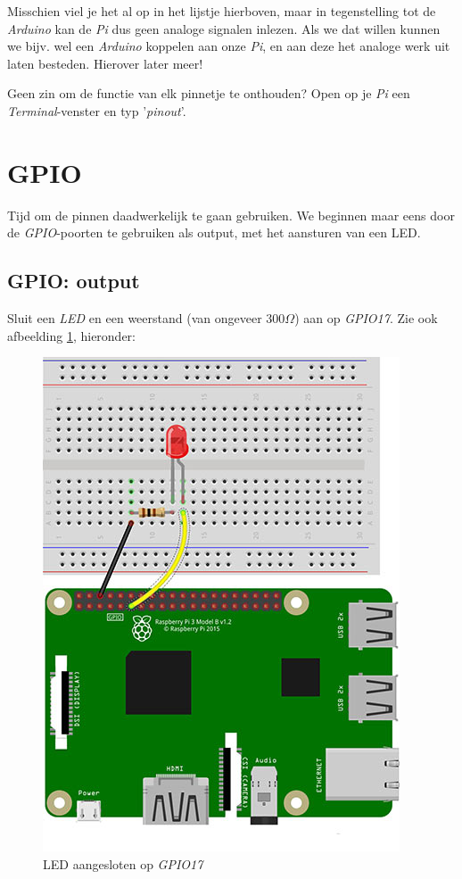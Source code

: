 \begin{remark}
Misschien viel je het al op in het lijstje hierboven, maar in tegenstelling tot de \textit{Arduino} kan de \textit{Pi} dus geen analoge signalen inlezen. Als we dat willen kunnen we bijv. wel een \textit{Arduino} koppelen aan onze \textit{Pi}, en aan deze het analoge werk uit laten besteden. Hierover later meer!    
\end{remark}

\begin{exercise}
Geen zin om de functie van elk pinnetje te onthouden? Open op je \textit{Pi} een \textit{Terminal}-venster en typ '\textit{pinout}'.
\end{exercise}

\newpage

\section{GPIO}
Tijd om de pinnen daadwerkelijk te gaan gebruiken. We beginnen maar eens door de \textit{GPIO}\--poorten te gebruiken als output, met het aansturen van een LED.
\subsection{GPIO: output}
Sluit een \textit{LED} en een weerstand (van ongeveer $300 \Omega$) aan op \textit{GPIO17}. Zie ook afbeelding \ref{fig:pi_led}, hieronder:
\begin{figure}[h!]
\centering\includegraphics[scale=0.45]{Pictures/chapter05/pi_led_01.jpg}
\caption{LED aangesloten op \textit{GPIO17}}
\label{fig:pi_led} %
\end{figure}

